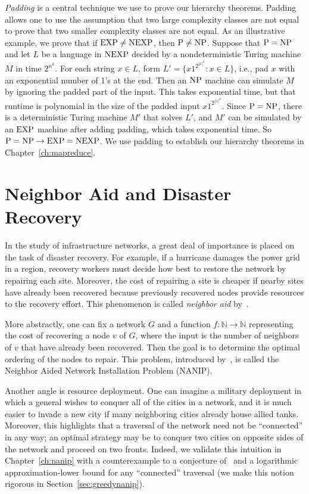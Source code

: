 \emph{Padding} is a central technique we use to prove our hierarchy theorems.
Padding allows one to use the assumption that two large complexity classes are
not equal to prove that two smaller complexity classes are not equal. As an
illustrative example, we prove that if $\textup{EXP} \neq \textup{NEXP}$, then $\textup{P} \neq
\textup{NP}$.  Suppose that $\textup{P} = \textup{NP}$ and let $L$ be a language in $\textup{NEXP}$ decided by
a nondeterministic Turing machine $M$ in time $2^{n^k}$. For each string $x \in
L$, form $L' = \{ x1^{2^{|x|^k}} : x \in L \}$, i.e., pad $x$ with an
exponential number of 1's at the end. Then an $\textup{NP}$ machine can simulate $M$ by
ignoring the padded part of the input. This takes exponential time, but that
runtime is polynomial in the size of the padded input $x1^{2^{|x|^k}}$. Since
$\textup{P} = \textup{NP}$, there is a deterministic Turing machine $M'$ that solves $L'$, and
$M'$ can be simulated by an $\textup{EXP}$ machine after adding padding, which takes
exponential time. So $\textup{P} = \textup{NP} \to \textup{EXP} = \textup{NEXP}$. We use padding to establish
our hierarchy theorems in Chapter~\ref{ch:mapreduce}.

\section{Neighbor Aid and Disaster Recovery}

In the study of infrastructure networks, a great deal of importance is placed
on the task of disaster recovery. For example, if a hurricane damages the power
grid in a region, recovery workers must decide how best to restore the network
by repairing each site. Moreover, the cost of repairing a site is cheaper if
nearby sites have already been recovered because previously recovered nodes
provide resources to the recovery effort. This phenomenon is called
\emph{neighbor aid} by~\cite{Gutfraind14}. 

More abstractly, one can fix a network $G$ and a function $f: \mathbb{N}
\to \mathbb{N}$ representing the cost of recovering a node $v$ of $G$, where the
input is the number of neighbors of $v$ that have already been recovered. Then
the goal is to determine the optimal ordering of the nodes to repair. This
problem, introduced by~\cite{Gutfraind14}, is called the Neighbor Aided Network
Installation Problem (NANIP).

Another angle is resource deployment. One can imagine a military deployment in
which a general wishes to conquer all of the cities in a network, and it is
much easier to invade a new city if many neighboring cities already house
allied tanks. Moreover, this highlights that a traversal of the network need
not be ``connected'' in any way; an optimal strategy may be to conquer two
cities on opposite sides of the network and proceed on two fronts. Indeed, we
validate this intuition in Chapter~\ref{ch:nanip} with a counterexample to a
conjecture of~\cite{Gutfraind14} and a logarithmic approximation-lower bound
for any ``connected'' traversal (we make this notion rigorous in
Section~\ref{sec:greedynanip}). 

